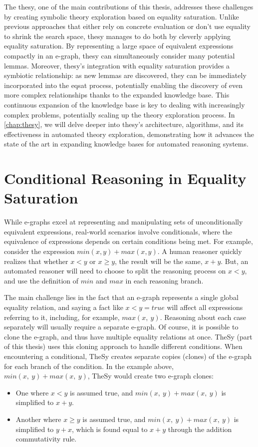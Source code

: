 The \gls{thesy}, one of the main contributions of this thesis, addresses these challenges by creating symbolic theory exploration based on equality saturation.
Unlike previous approaches that either rely on concrete evaluation or don't use equality to shrink the search space, \gls{thesy} manages to do both by cleverly applying equality saturation.
By representing a large space of equivalent expressions compactly in an e-graph, \gls{thesy} can simultaneously consider many potential lemmas. 
Moreover, \gls{thesy}'s integration with equality saturation provides a symbiotic relationship: as new lemmas are discovered, they can be immediately incorporated into the \gls{eqsat} process, potentially enabling the discovery of even more complex relationships thanks to the expanded knowledge base.
This continuous expansion of the knowledge base is key to dealing with increasingly complex problems, potentially scaling up the theory exploration process.
In \autoref{chap:thesy}, we will delve deeper into \gls{thesy}'s architecture, algorithms, and its effectiveness in automated theory exploration, demonstrating how it advances the state of the art in expanding knowledge bases for automated reasoning systems.


\section{Conditional Reasoning in Equality Saturation}

While e-graphs excel at representing and manipulating sets of unconditionally equivalent expressions,
real-world scenarios involve conditionals, where the equivalence of expressions depends on certain conditions being met. 
For example, consider the expression $min(x,y) + max(x,y)$.
A human reasoner quickly realizes that whether $x < y$ or $x \geq y$, the result will be the same, $x + y$.
But, an automated reasoner will need to choose to split the reasoning process on $x < y$, and use the definition of $min$ and $max$ in each reasoning branch.

The main challenge lies in the fact that an e-graph represents a single global equality relation, and saying a fact like $x < y = true$ will affect all expressions referring to it, including, for example, $max(x,~y)$.
Reasoning about each case separately will usually require a separate e-graph.
Of course, it is possible to clone the e-graph,
and thus have multiple equality relations at once.
TheSy \cite{thesy} (part of this thesis) uses this cloning approach to handle different conditions. 
When encountering a conditional, TheSy creates separate copies (clones) of the e-graph for each branch of the condition.
In the example above, $min(x,~y) + max(x,~y)$, TheSy would create two e-graph clones:
\begin{itemize}
    \item One where $x < y$ is assumed true, and $min(x,~y) + max(x,~y)$ is simplified to $x + y$.
    \item Another where $x \geq y$ is assumed true, and $min(x,~y) + max(x,~y)$ is simplified to $y + x$, which is found equal to $x + y$ through the addition commutativity rule.
\end{itemize}

